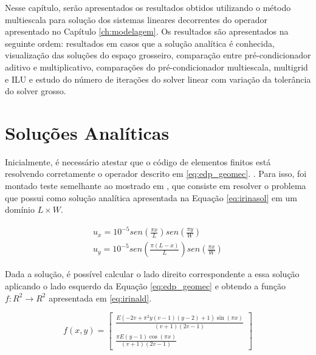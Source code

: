 Nesse capítulo, serão apresentados os resultados obtidos utilizando o método multiescala para solução dos sistemas lineares decorrentes do operador apresentado no Capítulo \ref{ch:modelagem}. Os resultados são apresentados na seguinte ordem: resultados em casos que a solução analítica é conhecida, visualização das soluções do espaço grosseiro, comparação entre pré-condicionador aditivo e multiplicativo, comparações do pré-condicionador multiescala, multigrid e ILU e estudo do número de iterações do solver linear com variação da tolerância do solver grosso.

\section{Soluções Analíticas}

Inicialmente, é necessário atestar que o código de elementos finitos está resolvendo corretamente o operador descrito em \eqref{eq:edp_geomec}.  {}.
Para isso, foi montado teste semelhante ao mostrado em \cite{irina}, que consiste em resolver o problema que possui como solução analítica apresentada na Equação \eqref{eq:irinasol} em um domínio  $L \times W$.


\begin{equation} \label{eq:irinasol}
  \begin{aligned}
  u_x = 10^{-5} sen(\frac{\pi x}{L}) sen(\frac{\pi y}{W})  \\
  u_y = 10^{-5} sen(\frac{\pi (L-x)}{L}) sen(\frac{\pi x}{W})
  \end{aligned}
\end{equation}

Dada a solução, é possível calcular o lado direito correspondente a essa solução aplicando o lado esquerdo da Equação \eqref{eq:edp_geomec} e obtendo a função $f: R^2 \rightarrow R^2$ apresentada em \eqref{eq:irinald}. 

\begin{equation} \label{eq:irinald}
f(x, y) = 
\left[\begin{matrix}\frac{E \left(- 2 v + \pi^{2} y \left(v - 1\right) \left(y - 2\right) + 1\right) \sin{\left (\pi x \right )}}{\left(v + 1\right) \left(2 v - 1\right)} \\ \frac{\pi E \left(y - 1\right) \cos{\left (\pi x \right )}}{\left(v + 1\right) \left(2 v - 1\right)}\end{matrix}\right]
\end{equation}

